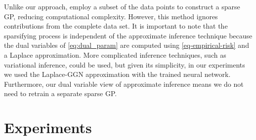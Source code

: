 \documentclass{article}
\renewcommand{\paragraph}[1]{{\bf #1}~~}
\newcommand{\our}{\textsc{sfr}\xspace}
\begin{document}
Unlike our approach, \citet{immer2021improving} employ a subset of the data points to construct a sparse GP, reducing computational complexity. However, this method ignores contributions from the complete data set. It is important to note that the sparsifying process is independent of the approximate inference technique because the dual variables of \cref{eq:dual_param} are computed using \cref{eq-empirical-risk} and a Laplace approximation. More complicated inference techniques, such as variational inference, could be used, but given its simplicity, in our experiments we used the Laplace-GGN approximation with the trained neural network. Furthermore, our dual variable view of approximate inference means we do not need to retrain a separate sparse GP.





\section{Experiments}
\label{sec:experiments}
%


\end{document}
